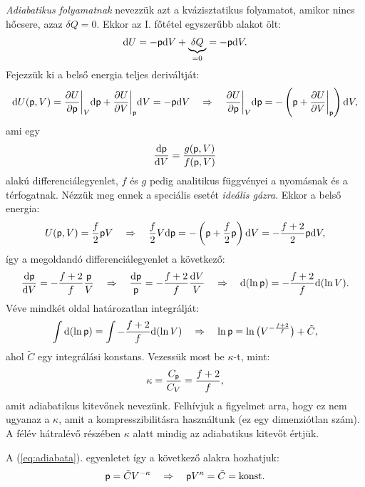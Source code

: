 \emph{Adiabatikus folyamatnak} nevezzük azt a kvázisztatikus folyamatot, amikor nincs hőcsere, azaz $\delta Q =0$. Ekkor az I. főtétel egyszerűbb alakot ölt:
\begin{align}
    \mathrm{d}U = -\mathsf p\mathrm{d}V + \underbrace{\delta Q}_{=0} = -\mathsf p \mathrm{d}V. 
\end{align}
Fejezzük ki a belső energia teljes deriváltját:
\begin{align}
    \mathrm{d}U(\mathsf p,V) = \frac{\partial{U}}{\partial{\mathsf p}}\bigg|_V\mathrm{d}\mathsf p + \frac{\partial{U}}{\partial{V}}\bigg|_\mathsf p \mathrm{d}V = -\mathsf p\mathrm{d}V\quad\Rightarrow\quad \frac{\partial{U}}{\partial{\mathsf p}}\bigg|_V \mathrm{d}\mathsf p = -\left({\mathsf p+\frac{\partial{U}}{\partial{V}}\bigg|_\mathsf p}\right)\mathrm{d}V,
\end{align}
ami egy
\begin{align}
    \frac{\mathrm{d}{\mathsf p}}{\mathrm{d}{V}} = \frac{g(\mathsf p,V)}{f(\mathsf p,V)}
\end{align}
alakú differenciálegyenlet, $f$ és $g$ pedig analitikus függvényei a nyomásnak és a térfogatnak. Nézzük meg ennek a speciális esetét \emph{ideális gázra}. Ekkor a belső energia:
\begin{align}
    U(\mathsf p,V) = \frac f2 \mathsf p V \quad\Rightarrow\quad \frac f2 V\mathrm{d}\mathsf p = -\left({\mathsf p+\frac f2 \mathsf p}\right)\mathrm{d}V = -\frac{f+2}{2}\mathsf p\mathrm{d}V,
\end{align}
így a megoldandó differenciálegyenlet a következő:
\begin{align}
    \frac{\mathrm{d}{\mathsf p}}{\mathrm{d}{V}} = -\frac{f+2}{f}\frac {\mathsf p} V \quad\Rightarrow\quad \frac{\mathrm{d}\mathsf p}{\mathsf p} = -\frac{f+2}{f}\frac{\mathrm{d}V}{V} \quad\Rightarrow\quad \mathrm{d}(\ln \mathsf p) = -\frac{f+2}{f}\mathrm{d}(\ln V).
\end{align}
Véve mindkét oldal határozatlan integrálját:
\begin{align}\label{eq:adiabata}
    \int \mathrm{d}(\ln \mathsf p) = \int -\frac{f+2}{f}\mathrm{d}(\ln V) \quad\Rightarrow\quad \ln \mathsf p = \ln\big(V^{-\frac{f+2}{f}}\big)+\tilde C,
\end{align}
ahol $\tilde C$ egy integrálási konstans. Vezessük most be $\kappa$-t, mint:
\begin{align}
    \kappa = \frac{C_\mathsf p}{C_V} = \frac{f+2}{f},
\end{align}
amit adiabatikus kitevőnek nevezünk. Felhívjuk a figyelmet arra, hogy ez nem ugyanaz a $\kappa$, amit a kompresszibilitásra használtunk (ez egy dimenziótlan szám). A félév hátralévő részében $\kappa$ alatt mindig az adiabatikus kitevőt értjük.

A (\ref{eq:adiabata}). egyenletet így a következő alakra hozhatjuk:
\begin{align}
    \mathsf p = \tilde C V^{-\kappa}\quad\Rightarrow\quad \mathsf p V^\kappa = \tilde C  = \textnormal{konst.}
\end{align}

